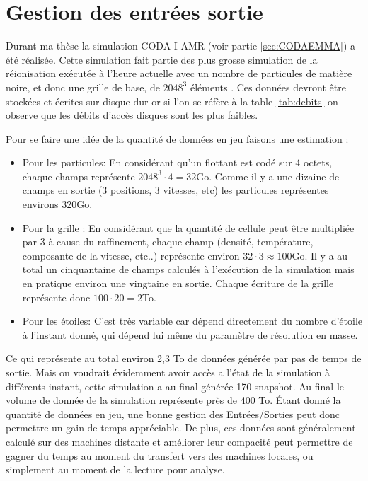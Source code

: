\section{Gestion des entrées sortie}

Durant ma thèse la simulation CODA I AMR (voir partie \ref{sec:CODAEMMA}) a été réalisée.
Cette simulation fait partie des plus grosse simulation de la réionisation exécutée à l'heure actuelle avec un nombre de particules de matière noire, et donc une grille de base, de $2048^3$ éléments .
Ces données devront être stockées et écrites sur disque dur or si l'on se réfère à la table \ref{tab:debits} on observe que les débits d'accès disques sont les plus faibles.

Pour se faire une idée de la quantité de données en jeu faisons une estimation : 

\begin{itemize}
\item Pour les particules:
En considérant qu'un flottant est codé sur 4 octets, chaque champs représente $2048^3 \cdot 4 = 32$Go.
Comme il y a une dizaine de champs en sortie (3 positions, 3 vitesses, etc) les particules représentes environs $320$Go.

\item Pour la grille :
En considérant que la quantité de cellule peut être multipliée par 3 à cause du raffinement, chaque champ (densité, température, composante de la vitesse, etc..) représente environ $32 \cdot 3 \approx 100$Go.
Il y a au total un cinquantaine de champs calculés à l'exécution de la simulation mais en pratique environ une vingtaine en sortie.
Chaque écriture de la grille représente donc $100\cdot 20 =2$To.

\item Pour les étoiles:
C'est très variable car dépend directement du nombre d'étoile à l'instant donné, qui dépend lui même du paramètre de résolution en masse.
\end{itemize}

Ce qui représente au total environ 2,3 To de données générée par pas de temps de sortie.
Mais on voudrait évidemment avoir accès a l'état de la simulation à différents instant, cette simulation a au final générée 170 snapshot.
Au final le volume de donnée de la simulation représente près de 400 To.
Étant donné la quantité de données en jeu, une bonne gestion des Entrées/Sorties peut donc permettre un gain de temps appréciable.
De plus, ces données sont généralement calculé sur des machines distante et améliorer leur compacité peut permettre de gagner du temps au moment du transfert vers des machines locales, ou simplement au moment de la lecture pour analyse.

